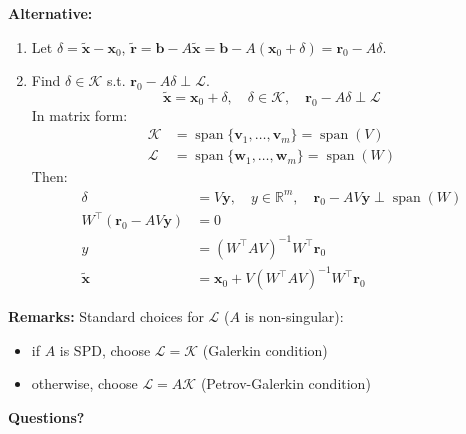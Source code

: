 \textbf{Alternative:}
\begin{enumerate}
    \item Let $\delta = \widetilde{\mathbf{x}} - \mathbf{x}_0$, $\widetilde{\mathbf{r}} = \mathbf{b} - A\widetilde{\mathbf{x}} = \mathbf{b} - A(\mathbf{x}_0 + \delta) = \mathbf{r}_0 - A\delta$.
    \item Find $\delta  \in  \mathcal{K}$ s.t. $\mathbf{r}_0 - A\delta \perp \mathcal{L}$.
          \[
              \widetilde{\mathbf{x}} = \mathbf{x}_0 + \delta, \quad \delta  \in  \mathcal{K}, \quad \mathbf{r}_0 - A\delta \perp \mathcal{L}
          \]
          In matrix form:
          \begin{align*}
              \mathcal{K} & = \operatorname{span}\{\mathbf{v}_1, \ldots, \mathbf{v}_m\} = \operatorname{span}(V) \\
              \mathcal{L} & = \operatorname{span}\{\mathbf{w}_1, \ldots, \mathbf{w}_m\} = \operatorname{span}(W)
          \end{align*}
          Then:
          \begin{align*}
              \delta            & = V \mathbf{y}, \quad y  \in  \mathbb{R}^m, \quad \mathbf{r}_0 - A V \mathbf{y} \perp \operatorname{span}(W) \\
              W^{\top} (\mathbf{r}_0 - A V \mathbf{y}) & = 0                                                                             \\
              y                 & = (W^{\top} A V)^{-1} W^{\top} \mathbf{r}_0                                                        \\
              \widetilde{\mathbf{x}}     & = \mathbf{x}_0 + V (W^{\top} A V)^{-1} W^{\top} \mathbf{r}_0
          \end{align*}
\end{enumerate}
\textbf{Remarks:}
Standard choices for $\mathcal{L}$ ($A$ is non-singular):
\begin{itemize}
    \item if $A$ is SPD, choose $\mathcal{L} = \mathcal{K}$ (Galerkin condition)
    \item otherwise, choose $\mathcal{L} = A\mathcal{K}$ (Petrov-Galerkin condition)
\end{itemize}
\textbf{Questions?}
